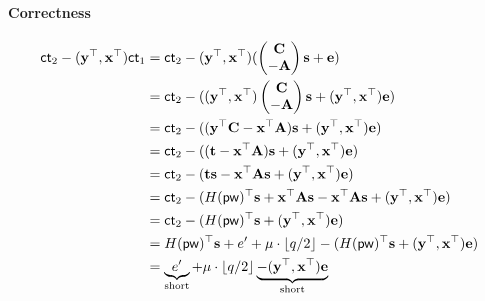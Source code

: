 \paragraph{Correctness}
\begin{align*}
    \ct_2-(\vecy^\top,\vecx^\top)\ct_1 &=\ct_2 - (\vecy^\top,\vecx^\top)(\colCA\vecs+\vece)\\
    &=\ct_2 - ((\vecy^\top,\vecx^\top)\colCA\vecs+(\vecy^\top,\vecx^\top)\vece)\\
    &= \ct_2- ((\vecy^\top\matC-\vecx^\top\matA)\vecs + (\vecy^\top,\vecx^\top)\vece)\\
    &= \ct_2 - ((\vect-\vecx^\top\matA)\vecs + (\vecy^\top,\vecx^\top)\vece)\\
    &=\ct_2 - (\vect\vecs-\vecx^\top\matA\vecs + (\vecy^\top,\vecx^\top)\vece)\\
    &=\ct_2 - (H(\pw)^\top\vecs + \vecx^\top\matA\vecs-\vecx^\top\matA\vecs + (\vecy^\top,\vecx^\top)\vece)\\
    &=\ct_2 - (H(\pw)^\top\vecs + (\vecy^\top,\vecx^\top)\vece)\\
    &=H(\pw)^\top\vecs+e'+\mu\cdot\qhalf -(H(\pw)^\top\vecs + (\vecy^\top,\vecx^\top)\vece) \\
    &=\underbrace{e'}_{\text{short}}+\mu\cdot\qhalf \underbrace{-  (\vecy^\top,\vecx^\top)\vece}_{\text{short}} \\
\end{align*}